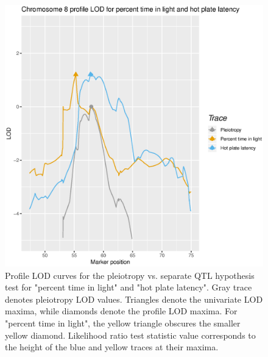 \documentclass[12pt,twoside, lineno]{gsajnl}
\begin{document}
\begin{figure}
\includegraphics[width = \textwidth]{2018-11-19-profile.eps}
\caption{Profile LOD curves for the pleiotropy vs. separate QTL hypothesis test for "percent time in light" and "hot plate latency". Gray trace denotes pleiotropy LOD values. Triangles denote the univariate LOD maxima, while diamonds denote the profile LOD maxima. For "percent time in light", the yellow triangle obscures the smaller yellow diamond. Likelihood ratio test statistic value corresponds to the height of the blue and yellow traces at their maxima.}
\label{fig:profiles}
\end{figure}







\end{document}
